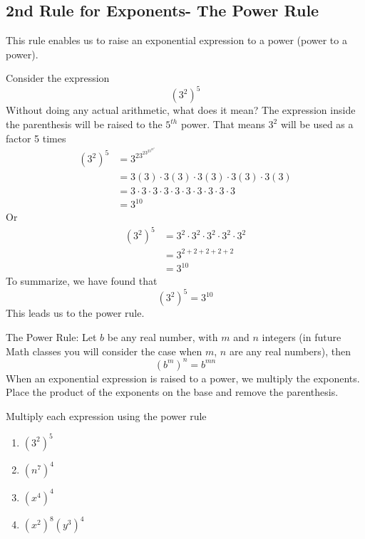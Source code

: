 \subsection{2nd Rule for Exponents- The Power Rule}
This rule enables us to raise an exponential expression to a power (power to a power).

Consider the expression
\[
	(3^2)^5
\]
Without doing any actual arithmetic, what does it mean? The expression inside the parenthesis
will be raised to the $5^{th}$ power. That means $3^2$ will be used as a factor 5 times
\begin{align*}
	(3^2)^5 & =		3^23^23^23^23^2                                                  \\
	        & =		3(3)\cdot 3(3)\cdot 3(3)\cdot 3(3)\cdot 3(3)                     \\
	        & =		3\cdot 3\cdot 3\cdot 3\cdot 3\cdot 3\cdot 3\cdot 3\cdot 3\cdot 3 \\
	        & =		3^{10}                                                           
\end{align*} 
Or
\begin{align*}
	(3^2)^5 & =		3^2\cdot 3^2\cdot 3^2\cdot 3^2\cdot 3^2 \\
	        & =		3^{2+2+2+2+2}                           \\
	        & =		3^{10}                                  
\end{align*}
To summarize, we have found that
\[
	(3^2)^5 = 3^{10}
\]
This leads us to the power rule.
\begin{myDefinition}
	The Power Rule: Let $b$ be any real number, with $m$ and $n$ integers (in future Math classes
	you will consider the case when $m$, $n$ are any real numbers), then
	\[
		(b^m)^n = b^{mn}
	\]
	When an exponential expression is raised to a power, we multiply the exponents. Place
	the product of the exponents on the base and remove the parenthesis.
\end{myDefinition}
\begin{myexample}
Multiply each expression using the power rule
\begin{multicols}{4}
	\begin{enumerate}
		\item $(3^2)^5$
		\item $(n^7)^4$
		\item $(x^4)^4$
		\item $(x^2)^8(y^3)^4$
	\end{enumerate}
\end{multicols}
\end{myexample}
